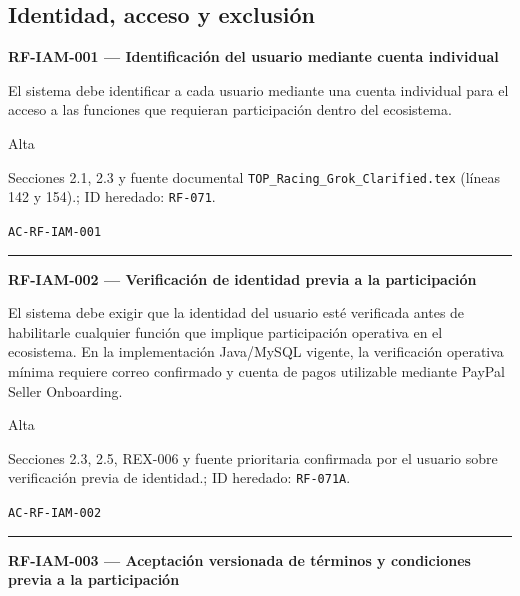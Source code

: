 \documentclass[10pt,letterpaper]{article}
\begin{document}
\subsection{Identidad, acceso y exclusión}
\noindent\textbf{RF-IAM-001 --- Identificación del usuario mediante cuenta individual}\par
\begin{description}[style=nextline,leftmargin=3.15cm,labelwidth=2.8cm,font=\normalfont\bfseries]
\item[Obligación] El sistema debe identificar a cada usuario mediante una cuenta individual para el acceso a las funciones que requieran participación dentro del ecosistema.
\item[Prioridad] Alta
\item[Procedencia] Secciones 2.1, 2.3 y fuente documental \texttt{TOP\_Racing\_Grok\_Clarified.tex} (líneas 142 y 154).; ID heredado: \texttt{RF-071}.
\item[Verificación] \texttt{AC-RF-IAM-001}
\end{description}
\vspace{0.25em}\hrule\vspace{0.65em}
\noindent\textbf{RF-IAM-002 --- Verificación de identidad previa a la participación}\par
\begin{description}[style=nextline,leftmargin=3.15cm,labelwidth=2.8cm,font=\normalfont\bfseries]
\item[Obligación] El sistema debe exigir que la identidad del usuario esté verificada antes de habilitarle cualquier función que implique participación operativa en el ecosistema. En la implementación Java/MySQL vigente, la verificación operativa mínima requiere correo confirmado y cuenta de pagos utilizable mediante PayPal Seller Onboarding.
\item[Prioridad] Alta
\item[Procedencia] Secciones 2.3, 2.5, REX-006 y fuente prioritaria confirmada por el usuario sobre verificación previa de identidad.; ID heredado: \texttt{RF-071A}.
\item[Verificación] \texttt{AC-RF-IAM-002}
\end{description}
\vspace{0.25em}\hrule\vspace{0.65em}
\noindent\textbf{RF-IAM-003 --- Aceptación versionada de términos y condiciones previa a la participación}\par
\end{document}
